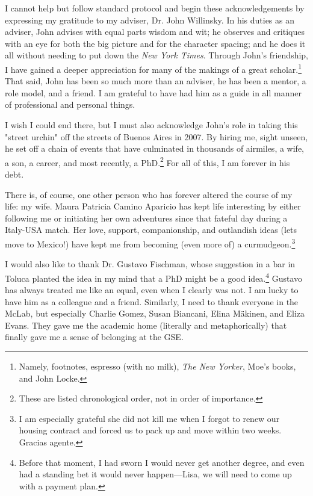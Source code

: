 I cannot help but follow standard protocol and begin these acknowledgements by expressing my gratitude to my adviser, Dr. John Willinsky. In his duties as an adviser, John advises with equal parts wisdom and wit; he observes and critiques with an eye for both the big picture and for the character spacing; and he does it all without needing to put down the \emph{New York Times}. Through John's friendship, I have gained a deeper appreciation for many of the makings of a great scholar.\footnote{Namely, footnotes, espresso (with no milk), \emph{The New Yorker}, Moe's books, and John Locke.} That said, John has been so much more than an adviser, he has been a mentor, a role model, and a friend. I am grateful to have had him as a guide in all manner of professional and personal things.

I wish I could end there, but I must also acknowledge John's role in taking this "street urchin" off the streets of Buenos Aires in 2007. By hiring me, sight unseen, he set off a chain of events that have culminated in thousands of airmiles, a wife, a son, a career, and most recently, a PhD.\footnote{These are listed chronological order, not in order of importance.} For all of this, I am forever in his debt.

There is, of course, one other person who has forever altered the course of my life: my wife. Maura Patricia Camino Aparicio has kept life interesting by either following me or initiating her own adventures since that fateful day during a Italy-USA match. Her love, support, companionship, and outlandish ideas (lets move to Mexico!) have kept me from becoming (even more of) a curmudgeon.\footnote{I am especially grateful she did not kill me when I forgot to renew our housing contract and forced us to pack up and move within two weeks. Gracias agente.}

I would also like to thank Dr. Gustavo Fischman, whose suggestion in a bar in Toluca planted the idea in my mind that a PhD might be a good idea.\footnote{Before that moment, I had sworn I would never get another degree, and even had a standing bet it would never happen—Lisa, we will need to come up with a payment plan.} Gustavo has always treated me like an equal, even when I clearly was not. I am lucky to have him as a colleague and a friend. Similarly, I need to thank everyone in the McLab, but especially Charlie Gomez, Susan Biancani, Elina Mäkinen, and Eliza Evans. They gave me the academic home (literally and metaphorically) that finally gave me a sense of belonging at the GSE.

